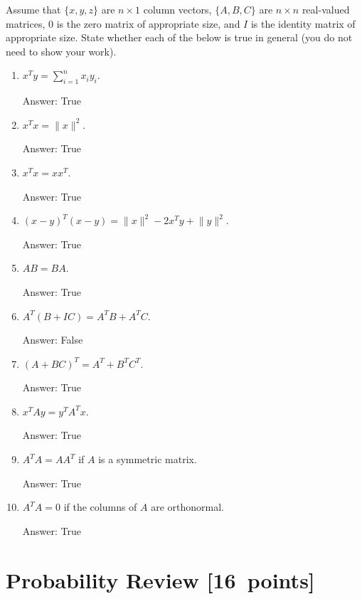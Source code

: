 \documentclass{article}
\newcommand{\blu}[1]{{\textcolor{blu}{#1}}}
\newenvironment{answer}{\par\begingroup\color{gre}Answer: }{\endgroup}
\let\ask\blu
\newcommand\pts[1]{\textcolor{pointscolour}{[#1~points]}}
\newcommand{\norm}[1]{\lVert #1 \rVert}
\begin{document}
  Assume that $\{x,y,z\}$ are $n \times 1$ column vectors, $\{A,B,C\}$ are $n \times n$ real-valued matrices, $0$ is the zero matrix of appropriate size, and $I$ is the identity matrix of appropriate size. \ask{State whether each of the below is true in general} (you do not need to show your work).

  \begin{enumerate}
  \item $x^Ty = \sum_{i=1}^n x_iy_i$.
  \begin{answer}
  True
  \end{answer}
  \item $x^Tx = \norm{x}^2$.
  \begin{answer}
  True
  \end{answer}
  \item $x^Tx = xx^T$.
  \begin{answer}
  True
  \end{answer}
  \item $(x-y)^T(x-y) = \norm{x}^2 - 2x^Ty + \norm{y}^2$.
  \begin{answer}
  True
  \end{answer}
  \item $AB=BA$.
  \begin{answer}
  True
  \end{answer}
  \item $A^T(B + IC) = A^TB + A^TC$.
  \begin{answer}
  False
  \end{answer}
  \item $(A + BC)^T = A^T + B^TC^T$.
  \begin{answer}
  True
  \end{answer}
  \item $x^TAy = y^TA^Tx$.
  \begin{answer}
  True
  \end{answer}
  \item $A^TA = AA^T$ if $A$ is a symmetric matrix.
  \begin{answer}
  True
  \end{answer}
  \item $A^TA = 0$ if the columns of $A$ are orthonormal.
  \begin{answer}
  True
  \end{answer}
  \end{enumerate}


  \clearpage\section{Probability Review \pts{16}}
\end{document}
